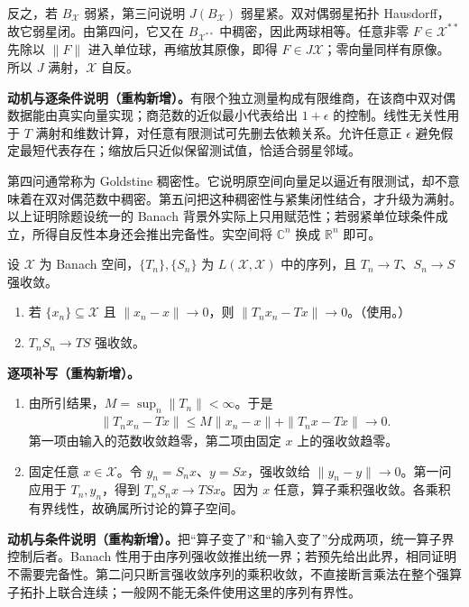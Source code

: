 \documentclass[../../main.tex]{subfiles}
\begin{document}
\begin{solution}
\begin{enumerate}
反之，若 $B_{\mathcal X}$ 弱紧，第三问说明 $J(B_{\mathcal X})$ 弱星紧。双对偶弱星拓扑 Hausdorff，故它弱星闭。由第四问，它又在 $B_{\mathcal X^{**}}$ 中稠密，因此两球相等。任意非零 $F\in\mathcal X^{**}$ 先除以 $\|F\|$ 进入单位球，再缩放其原像，即得 $F\in J\mathcal X$；零向量同样有原像。所以 $J$ 满射，$\mathcal X$ 自反。
\end{enumerate}
\end{solution}
\begin{remark}
\textbf{动机与逐条件说明（重构新增）。}有限个独立测量构成有限维商，在该商中双对偶数据能由真实向量实现；商范数的近似最小代表给出 $1+\epsilon$ 的控制。线性无关性用于 $T$ 满射和维数计算，对任意有限测试可先删去依赖关系。允许任意正 $\epsilon$ 避免假定最短代表存在；缩放后只近似保留测试值，恰适合弱星邻域。

第四问通常称为 Goldstine 稠密性。它说明原空间向量足以逼近有限测试，却不意味着在双对偶范数中稠密。第五问把这种稠密性与紧集闭性结合，才升级为满射。以上证明除题设统一的 Banach 背景外实际上只用赋范性；若弱紧单位球条件成立，所得自反性本身还会推出完备性。实空间将 $\mathbb C^n$ 换成 $\mathbb R^n$ 即可。
\end{remark}
\begin{exercise}\label{exercise:ch05-strong-operator-products}
设 $\mathcal X$ 为 Banach 空间，$\{T_n\},\{S_n\}$ 为 $L(\mathcal X,\mathcal X)$ 中的序列，且 $T_n\to T$、$S_n\to S$ 强收敛。
\begin{enumerate}
\item\label{item:ch05-strong-moving-input} 若 $\{x_n\}\subseteq\mathcal X$ 且 $\|x_n-x\|\to0$，则 $\|T_nx_n-Tx\|\to0$。（使用。）
\item\label{item:ch05-strong-product-convergence} $T_nS_n\to TS$ 强收敛。
\end{enumerate}
\end{exercise}
\begin{solution}
\textbf{逐项补写（重构新增）。}
\begin{enumerate}
\item 由所引结果，$M=\sup_n\|T_n\|<\infty$。于是
\begin{align*}
\|T_nx_n-Tx\|\le M\|x_n-x\|+\|T_nx-Tx\|\longrightarrow0.
\end{align*}
第一项由输入的范数收敛趋零，第二项由固定 $x$ 上的强收敛趋零。
\item 固定任意 $x\in\mathcal X$。令 $y_n=S_nx$、$y=Sx$，强收敛给 $\|y_n-y\|\to0$。第一问应用于 $T_n,y_n$，得到 $T_nS_nx\to TSx$。因为 $x$ 任意，算子乘积强收敛。各乘积有界线性，故确属所讨论的算子空间。
\end{enumerate}
\end{solution}
\begin{remark}
\textbf{动机与条件说明（重构新增）。}把“算子变了”和“输入变了”分成两项，统一算子界控制后者。Banach 性用于由序列强收敛推出统一界；若预先给出此界，相同证明不需要完备性。第二问只断言强收敛序列的乘积收敛，不直接断言乘法在整个强算子拓扑上联合连续；一般网不能无条件使用这里的序列有界性。
\end{remark}
\end{document}
